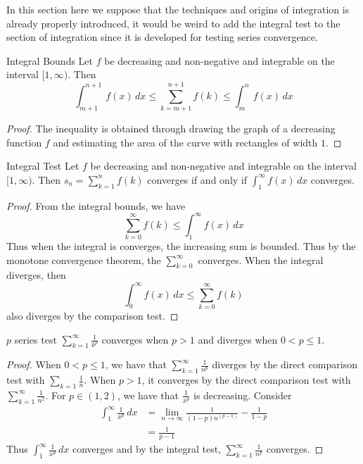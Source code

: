 \documentclass[a4paper]{article}
\begin{document}
In this section here we suppose that the techniques and origins of integration is already properly introduced, it would be weird to add the integral test to the section of integration since it is developed for testing series convergence. 
\begin{thm}{Integral Bounds}{} Let $f$ be decreasing and non-negative and integrable on the interval $[1,\infty)$. Then $$\int_{m+1}^{n+1}f(x)\,dx\leq\sum_{k=m+1}^{n+1}f(k)\leq\int_{m}^{n}f(x)\,dx$$ \tcbline
\begin{proof} The inequality is obtained through drawing the graph of a decreasing function $f$ and estimating the area of the curve with rectangles of width $1$. 
\end{proof}
\end{thm}

\begin{thm}{Integral Test}{} Let $f$ be decreasing and non-negative and integrable on the interval $[1,\infty)$. Then $s_n=\sum_{k=1}^{n}f(k)$ converges if and only if $\int_{1}^{\infty}f(x)\,dx$ converges. \tcbline
\begin{proof} From the integral bounds, we have $$\sum_{k=0}^{\infty}f(k)\leq\int_{1}^{\infty}f(x)\,dx$$ Thus when the integral is converges, the increasing sum is bounded. Thus by the monotone convergence theorem, the $\sum_{k=0}^{\infty}$ converges. When the integral diverges, then $$\int_{0}^{\infty}f(x)\,dx\leq\sum_{k=0}^{\infty}f(k)$$ also diverges by the comparison test. 
\end{proof}
\end{thm}

\begin{thm}{$p$ series test}{} $\sum_{k=1}^{\infty}\frac{1}{k^p}$ converges when $p>1$ and diverges when $0<p\leq1$. \tcbline
\begin{proof} When $0<p\leq1$, we have that $\sum_{k=1}^{\infty}\frac{1}{n^p}$ diverges by the direct comparison test with $\sum_{k=1}\frac{1}{n}$. When $p>1$, it converges by the direct comparison test with $\sum_{k=1}^{\infty}\frac{1}{n^2}$. For $p\in(1,2)$, we have that $\frac{1}{x^p}$ is decreasing. Consider 
\begin{align*}
\int_{1}^{\infty}\frac{1}{x^p}\,dx&=\lim_{n\to\infty}\frac{1}{(1-p)n^{(p-1)}}-\frac{1}{1-p}\\
&=\frac{1}{p-1}
\end{align*}Thus $\int_{1}^{\infty}\frac{1}{x^p}\,dx$ converges and by the integral test, $\sum_{k=1}^{\infty}\frac{1}{n^p}$ converges. 
\end{proof}
\end{thm}
\end{document}
